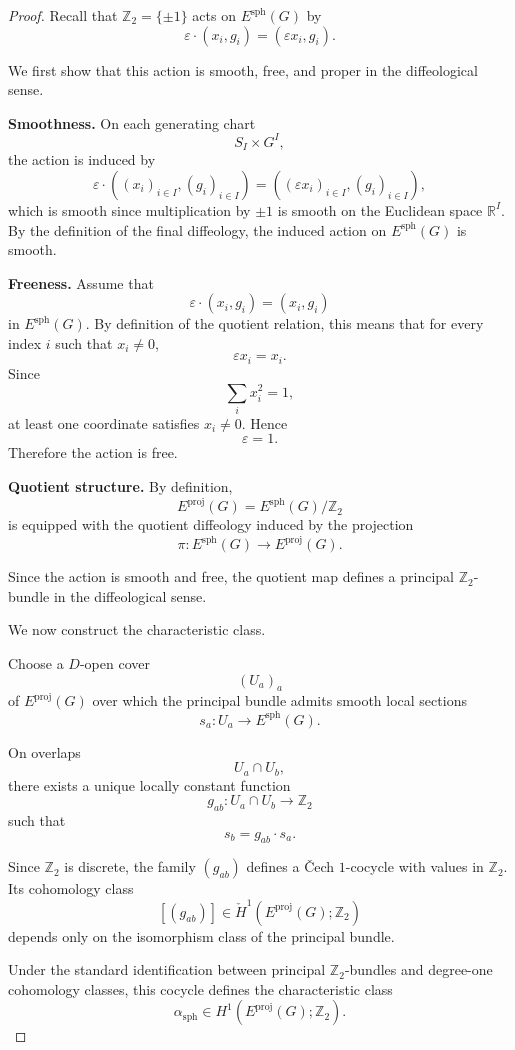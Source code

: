 \documentclass[10pt,a4paper]{amsart}
\begin{document}
\begin{proof}
Recall that \(\mathbb Z_2=\{\pm1\}\) acts on
\(E^{\mathrm{sph}}(G)\) by
\[
\varepsilon\cdot(x_i,g_i)
=
(\varepsilon x_i,g_i).
\]

We first show that this action is smooth, free, and proper in the
diffeological sense.

\medskip

\noindent
\textbf{Smoothness.}
On each generating chart
\[
S_I\times G^I,
\]
the action is induced by
\[
\varepsilon\cdot((x_i)_{i\in I},(g_i)_{i\in I})
=
((\varepsilon x_i)_{i\in I},(g_i)_{i\in I}),
\]
which is smooth since multiplication by \(\pm1\) is smooth on the Euclidean
space \(\mathbb R^I\). By the definition of the final diffeology, the induced
action on \(E^{\mathrm{sph}}(G)\) is smooth.

\medskip

\noindent
\textbf{Freeness.}
Assume that
\[
\varepsilon\cdot(x_i,g_i)=(x_i,g_i)
\]
in \(E^{\mathrm{sph}}(G)\). By definition of the quotient relation, this means
that for every index \(i\) such that \(x_i\neq0\),
\[
\varepsilon x_i=x_i.
\]
Since
\[
\sum_i x_i^2=1,
\]
at least one coordinate satisfies \(x_i\neq0\). Hence
\[
\varepsilon=1.
\]
Therefore the action is free.

\medskip

\noindent
\textbf{Quotient structure.}
By definition,
\[
E^{\mathrm{proj}}(G)
=
E^{\mathrm{sph}}(G)/\mathbb Z_2
\]
is equipped with the quotient diffeology induced by the projection
\[
\pi:E^{\mathrm{sph}}(G)\to E^{\mathrm{proj}}(G).
\]

Since the action is smooth and free, the quotient map defines a principal
\(\mathbb Z_2\)-bundle in the diffeological sense.

\medskip

We now construct the characteristic class.

Choose a \(D\)-open cover
\[
(U_a)_a
\]
of \(E^{\mathrm{proj}}(G)\) over which the principal bundle admits smooth local
sections
\[
s_a:U_a\to E^{\mathrm{sph}}(G).
\]

On overlaps
\[
U_a\cap U_b,
\]
there exists a unique locally constant function
\[
g_{ab}:U_a\cap U_b\to\mathbb Z_2
\]
such that
\[
s_b=g_{ab}\cdot s_a.
\]

Since \(\mathbb Z_2\) is discrete, the family \((g_{ab})\) defines a
Čech \(1\)-cocycle with values in \(\mathbb Z_2\). Its cohomology class
\[
[(g_{ab})]
\in
\check H^1(E^{\mathrm{proj}}(G);\mathbb Z_2)
\]
depends only on the isomorphism class of the principal bundle.

Under the standard identification between principal \(\mathbb Z_2\)-bundles
and degree-one cohomology classes, this cocycle defines the characteristic
class
\[
\alpha_{\mathrm{sph}}
\in
H^1(E^{\mathrm{proj}}(G);\mathbb Z_2).
\]
\end{proof}
\end{document}
